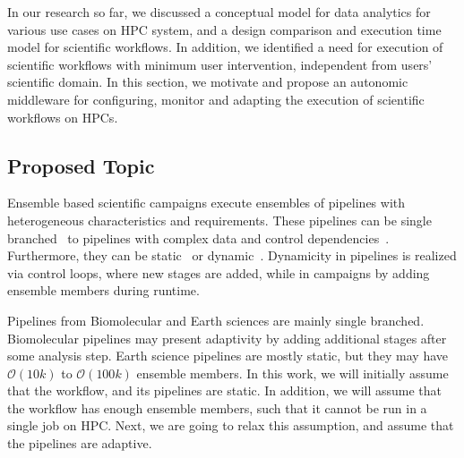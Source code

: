 \label{research}
In our research so far, we discussed a conceptual model for data analytics for 
various use cases on HPC system, and a design comparison and execution time 
model for scientific workflows. In addition, we identified a need for execution 
of  scientific workflows with minimum user intervention, independent from 
users' scientific domain. In this section, we motivate and propose an 
autonomic middleware for configuring, monitor and adapting the execution of 
scientific workflows on HPCs.

\subsection{Proposed Topic}
%
%

Ensemble based scientific campaigns execute ensembles of pipelines with 
heterogeneous characteristics and requirements. These pipelines can be single 
branched~\cite{paraskevakos2019workflow,dakka2018high,ramakrishnan_survey,
balasubramanian2018harnessing} to pipelines with complex data and control 
dependencies~\cite{ramakrishnan_survey,deelman2018future}. Furthermore, they 
can be static~\cite{paraskevakos2019workflow} or dynamic~\cite{dakka2018high,
balasubramanian2018harnessing}. Dynamicity in pipelines is realized via 
control loops, where new stages are added, while in campaigns by adding 
ensemble members during runtime.

Pipelines from Biomolecular and Earth sciences are mainly single branched. 
Biomolecular pipelines may present adaptivity by adding additional stages 
after some analysis step. Earth science pipelines are mostly static, but they 
may have $\mathcal{O}(10k)$ to $\mathcal{O}(100k)$ ensemble members. In this 
work, we will initially assume that the workflow, and its pipelines are 
static. In addition, we will assume that the workflow has enough ensemble 
members, such that it cannot be run in a single job on HPC. Next, we are 
going to relax this assumption, and assume that the pipelines are adaptive.

